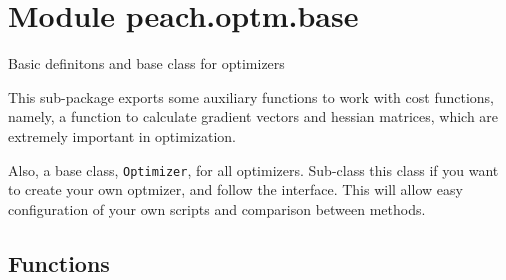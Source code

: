 %
%
%


\section{Module peach.optm.base}

    \label{peach:optm:base}

Basic definitons and base class for optimizers

This sub-package exports some auxiliary functions to work with cost functions,
namely, a function to calculate gradient vectors and hessian matrices, which are
extremely important in optimization.

Also, a base class, \texttt{Optimizer}, for all optimizers. Sub-class this class if
you want to create your own optmizer, and follow the interface. This will allow
easy configuration of your own scripts and comparison between methods.


  \subsection{Functions}

    \label{peach:optm:base:gradient}

    \vspace{0.5ex}

